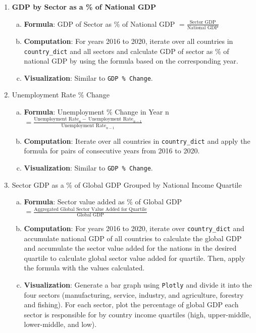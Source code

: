 \documentclass[fontsize=11pt]{article}
\begin{document}
\begin{enumerate}
        \item \textbf{GDP by Sector as a \% of National GDP}
            \begin{enumerate}[(a)]
                \item \textbf{Formula}: GDP of Sector as \% of National GDP $= \frac{\text{Sector GDP}}{\text{National GDP}}$
                \item \textbf{Computation}: For years 2016 to 2020, iterate over all countries in \texttt{country\_dict} and all sectors and calculate GDP of sector as \% of national GDP by using the formula based on the corresponding year.
                \item \textbf{Visualization}: Similar to \texttt{GDP \% Change}.
            \end{enumerate}
        \item Unemployment Rate \% Change
            \begin{enumerate}[(a)]
                \item \textbf{Formula}: Unemployment \% Change in Year n $= \frac{\text{Unemployment \ Rate}_{n}-\  \text{Unemployment \ Rate}_{n-1}}{\text{Unemployment \ Rate}_{n-1}}$
                \item \textbf{Computation}: Iterate over all countries in \texttt{country\_dict} and apply the formula for pairs of consecutive years from 2016 to 2020.
                \item \textbf{Visualization}: Similar to \texttt{GDP \% Change}.
            \end{enumerate}
        \item Sector GDP as a \% of Global GDP Grouped by National Income Quartile
            \begin{enumerate}[(a)]
                \item \textbf{Formula}: Sector value added as \% of Global GDP $= \frac{\text{Aggregated \ Global \ Sector \ Value \ Added \ for \ Quartile}}{\text{Global \ GDP}}$
                \item \textbf{Computation}: For years 2016 to 2020, iterate over \texttt{country\_dict} and accumulate national GDP of all countries to calculate the global GDP and accumulate the sector value added for the nations in the desired quartile to calculate global sector value added for quartile. Then, apply the formula with the values calculated.
                \item \textbf{Visualization}: Generate a bar graph using \texttt{Plotly} and divide it into the four sectors (manufacturing, service, industry, and agriculture, forestry and fishing). For each sector, plot the percentage of global GDP each sector is responsible for by country income quartiles (high, upper-middle, lower-middle, and low).

\end{enumerate}
\end{enumerate}
\end{document}
